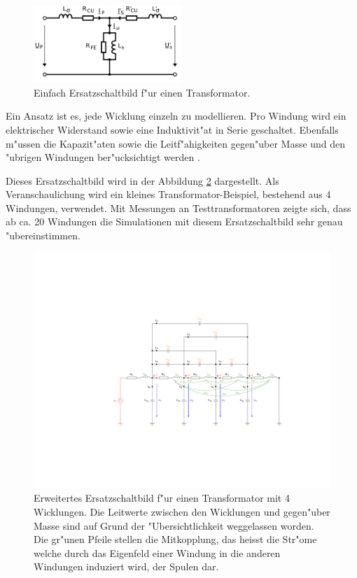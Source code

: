 \begin{refsection}
\begin{figure}
	\centering
	\includegraphics[width=0.5\textwidth]{./trafo/images/Einfaches_ESB.png}
	\caption[Einfaches Ersatzschaltbild f"ur einen Transformator]{Einfach Ersatzschaltbild f"ur einen Transformator.}
	\label{trafo:einfaches_ESB}
\end{figure}

Ein Ansatz ist es, jede Wicklung einzeln zu modellieren. Pro Windung wird ein elektrischer Widerstand sowie eine Induktivit"at in Serie geschaltet. Ebenfalls m"ussen die Kapazit"aten sowie die Leitf"ahigkeiten gegen"uber Masse und den "ubrigen Windungen ber"ucksichtigt werden \cite{trafo:BILImpulse}. 

Dieses Ersatzschaltbild wird in der Abbildung \ref{trafo:erweitertes_ESB} dargestellt. Als Veranschaulichung wird ein kleines Transformator-Beispiel, bestehend aus 4 Windungen, verwendet. Mit Messungen an Testtransformatoren zeigte sich, dass ab ca. 20 Windungen die Simulationen mit diesem Ersatzschaltbild sehr genau "ubereinstimmen. 

\begin{figure}
	\centering
	\includegraphics[width=\hsize]{./trafo/images/Trafo_Modell.pdf}
	\caption[Erweitertes Ersatzschaltbild f"ur einen Transformator]{Erweitertes Ersatzschaltbild f"ur einen Transformator mit 4 Wicklungen. Die Leitwerte zwischen den Wicklungen und gegen"uber Masse sind auf Grund der "Ubersichtlichkeit weggelassen worden. Die gr"unen Pfeile stellen die Mitkopplung, das heisst die Str"ome welche durch das Eigenfeld einer Windung in die anderen Windungen induziert wird, der Spulen dar. }
	\label{trafo:erweitertes_ESB}
\end{figure}


\end{refsection}
